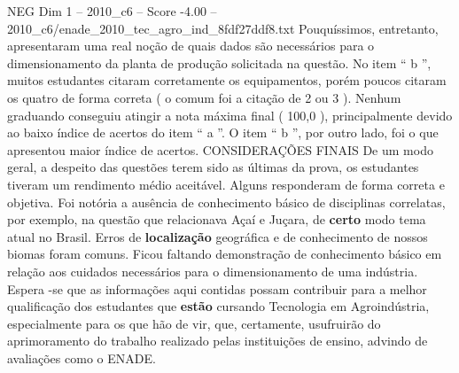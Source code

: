 \begin{textsample}{NEG Dim 1 – 2010\_c6 – Score -4.00 – 2010\_c6/enade\_2010\_tec\_agro\_ind\_8fdf27ddf8.txt}
Pouquíssimos, entretanto, apresentaram uma real noção de quais dados são necessários para o dimensionamento da planta de produção solicitada na questão.
No item “ b ”, muitos estudantes citaram corretamente os equipamentos, porém poucos citaram os quatro de forma correta ( o comum foi a citação de 2 ou 3 ).
Nenhum graduando conseguiu atingir a nota máxima final ( 100,0 ), principalmente devido ao baixo índice de acertos do item “ a ”.
O item “ b ”, por outro lado, foi o que apresentou maior índice de acertos.
CONSIDERAÇÕES FINAIS De um modo geral, a despeito das questões terem sido as últimas da prova, os estudantes tiveram um rendimento médio aceitável.
Alguns responderam de forma correta e objetiva.
Foi notória a ausência de conhecimento básico de disciplinas correlatas, por exemplo, na questão que relacionava Açaí e Juçara, de \textbf{certo} modo tema atual no Brasil.
Erros de \textbf{localização} geográfica e de conhecimento de nossos biomas foram comuns.
Ficou faltando demonstração de conhecimento básico em relação aos cuidados necessários para o dimensionamento de uma indústria.
Espera -se que as informações aqui contidas possam contribuir para a melhor qualificação dos estudantes que \textbf{estão} cursando Tecnologia em Agroindústria, especialmente para os que hão de vir, que, certamente, usufruirão do aprimoramento do trabalho realizado pelas instituições de ensino, advindo de avaliações como o ENADE.

\end{textsample}
